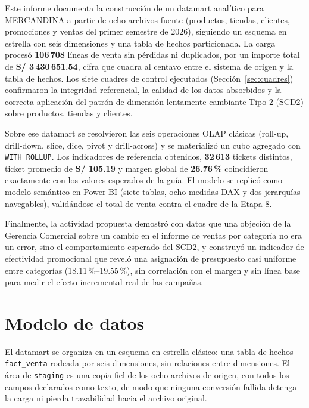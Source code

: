 \documentclass[11pt,a4paper]{article}
\begin{document}
Este informe documenta la construcción de un datamart analítico para MERCANDINA a partir de ocho archivos fuente (productos, tiendas, clientes, promociones y ventas del primer semestre de 2026), siguiendo un esquema en estrella con seis dimensiones y una tabla de hechos particionada. La carga procesó \textbf{106\,708} líneas de venta sin pérdidas ni duplicados, por un importe total de \textbf{S/ 3\,430\,651.54}, cifra que cuadra al centavo entre el sistema de origen y la tabla de hechos. Los siete cuadres de control ejecutados (Sección~\ref{sec:cuadres}) confirmaron la integridad referencial, la calidad de los datos absorbidos y la correcta aplicación del patrón de dimensión lentamente cambiante Tipo 2 (SCD2) sobre productos, tiendas y clientes.

Sobre ese datamart se resolvieron las seis operaciones OLAP clásicas (roll-up, drill-down, slice, dice, pivot y drill-across) y se materializó un cubo agregado con \texttt{WITH ROLLUP}. Los indicadores de referencia obtenidos, \textbf{32\,613} tickets distintos, ticket promedio de \textbf{S/ 105.19} y margen global de \textbf{26.76\,\%} coincidieron exactamente con los valores esperados de la guía. El modelo se replicó como modelo semántico en Power BI (siete tablas, ocho medidas DAX y dos jerarquías navegables), validándose el total de venta contra el cuadre de la Etapa 8.

Finalmente, la actividad propuesta demostró con datos que una objeción de la Gerencia Comercial sobre un cambio en el informe de ventas por categoría no era un error, sino el comportamiento esperado del SCD2, y construyó un indicador de efectividad promocional que reveló una asignación de presupuesto casi uniforme entre categorías (18.11\,\%–19.55\,\%), sin correlación con el margen y sin línea base para medir el efecto incremental real de las campañas.


\section{Modelo de datos}

El datamart se organiza en un esquema en estrella clásico: una tabla de hechos \texttt{fact\_venta} rodeada por seis dimensiones, sin relaciones entre dimensiones. El área de \texttt{staging} es una copia fiel de los ocho archivos de origen, con todos los campos declarados como texto, de modo que ninguna conversión fallida detenga la carga ni pierda trazabilidad hacia el archivo original.
\end{document}
